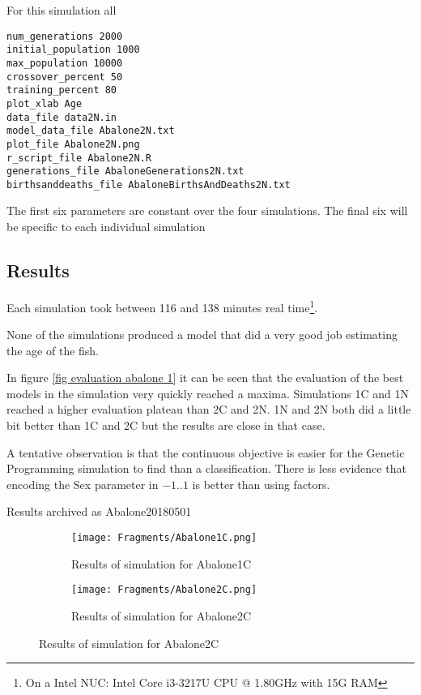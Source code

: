 \documentclass[a4paper,twoside]{article}
\begin{document}
\begin{enumerate}
For this simulation all 

\begin{verbatim}
num_generations 2000
initial_population 1000
max_population 10000
crossover_percent 50
training_percent 80
plot_xlab Age
data_file data2N.in
model_data_file Abalone2N.txt
plot_file Abalone2N.png
r_script_file Abalone2N.R
generations_file AbaloneGenerations2N.txt
birthsanddeaths_file AbaloneBirthsAndDeaths2N.txt
\end{verbatim}

The first six parameters are constant over the four simulations.  The
final six will be specific to each individual simulation

\subsection{Results}

Each simulation took between 116 and 138 minutes real time\footnote{On
  a Intel NUC: Intel Core i3-3217U CPU @ 1.80GHz with 15G RAM}.

None of the simulations produced a model that did a very good job
estimating the age of the fish.

In figure \ref{fig evaluation abalone 1} it can be seen that the
evaluation of the best models in the simulation very quickly reached a
maxima.  Simulations 1C and 1N reached a higher evaluation plateau
than 2C and 2N.  1N and 2N both did a little bit better than 1C and 2C
but the results are close in that case.

A tentative observation is that the continuous objective is easier for
the Genetic Programming simulation to find than a classification.
There is less evidence that encoding the Sex parameter in $-1..1$ is
better than using factors.


Results archived as Abalone20180501

\begin{figure}
  \centering
  \begin{subfigure}[b]{0.4\textwidth}
    \begin{center}
      \texttt{[image: Fragments/Abalone1C.png]}
    \end{center}
    \caption{Results of simulation for Abalone1C}
    \label{fig:results.Abalone1C}
  \end{subfigure}  
\hfill
  \begin{subfigure}[b]{0.4\textwidth}
    \begin{center}
      \texttt{[image: Fragments/Abalone2C.png]}
    \end{center}
    \caption{Results of simulation for Abalone2C}
    \label{fig:results.Abalone2C}
  \end{subfigure}


\end{figure}
\end{enumerate}
\end{document}
